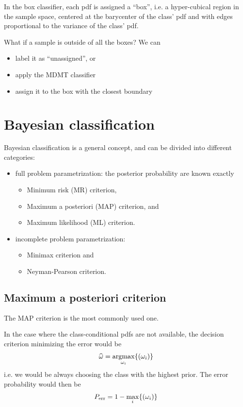 \documentclass[oneside,onecolumn]{report}
\DeclareMathOperator*{\argmax}{argmax}
\let\P\relax
\DeclareMathOperator*{\P}{P}
\begin{document}
In the box classifier, each pdf is assigned a ``box'', i.e. a hyper-cubical region in the sample space, centered at the barycenter of the class' pdf and with edges proportional to the variance of the class' pdf.

What if a sample is outside of all the boxes?
We can
\begin{itemize}
    \item label it as ``unassigned'', or
    \item apply the MDMT classifier
    \item assign it to the box with the closest boundary
\end{itemize}

\section{Bayesian classification}
Bayesian classification is a general concept, and can be divided into different categories:
\begin{itemize}
    \item full problem parametrization: the posterior probability are known exactly
    \begin{itemize}
        \item Minimum risk (MR) criterion,
        \item Maximum a posteriori (MAP) criterion, and
        \item Maximum likelihood (ML) criterion.
    \end{itemize}
    \item incomplete problem parametrization:
    \begin{itemize}
        \item Minimax criterion and
        \item Neyman-Pearson criterion.
    \end{itemize}
\end{itemize}

\subsection{Maximum a posteriori criterion}
The MAP criterion is the most commonly used one.

In the case where the class-conditional pdfs are not available, the decision criterion minimizing the error would be
$$ \widehat \omega = \argmax_{\omega_i} \{ \P(\omega_i) \}$$
i.e. we would be always choosing the class with the highest prior.
The error probability would then be
$$ P_\text{err} = 1 - \max_i \{ \P(\omega_i) \} $$
\end{document}
